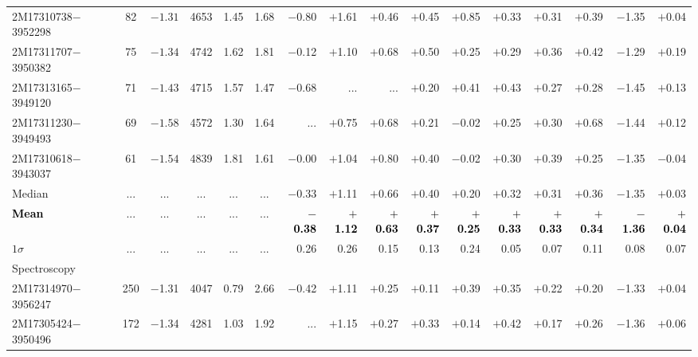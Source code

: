 \documentclass[longauth]{aa} %
\begin{document}
\begin{table*}
\begin{small}
\begin{center}
\begin{tabular}{lcccccrrrrrrrrrr}
2M17310738$-$3952298 &    82 &  $-1.31$ & 4653  & 1.45 &  1.68  &  $-$0.80  &  $+$1.61 &  $+$0.46 & $+$0.45 & $+$0.85 &  $+$0.33 &  $+$0.31 &    $+$0.39 & $-$1.35 &    $+$0.04 \\
2M17311707$-$3950382 &    75 & $-1.34$ & 4742  & 1.62 &  1.81  &  $-$0.12  &  $+$1.10 &   $+$0.68 & $+$0.50 & $+$0.25 &  $+$0.29 &  $+$0.36 &    $+$0.42 & $-$1.29 &    $+$0.19 \\
2M17313165$-$3949120 &    71 & $-1.43$ & 4715  & 1.57 &  1.47  &  $-$0.68   &  ...  &  ...  &  $+$0.20 &  $+$0.41 & $+$0.43 & $+$0.27 &  $+$0.28 &    $-$1.45 &  $+$0.13 \\
2M17311230$-$3949493 &    69 & $-1.58$ & 4572  & 1.30 &  1.64  &  ...               &  $+$0.75 &  $+$0.68 & $+$0.21 & $-$0.02 &  $+$0.25 &  $+$0.30 &    $+$0.68 & $-$1.44 &    $+$0.12 \\
2M17310618$-$3943037 &    61 & $-1.54$ & 4839  & 1.81 &  1.61  &  $-$0.00  &  $+$1.04  &  $+$0.80 & $+$0.40 & $-$0.02 &  $+$0.30 &  $+$0.39 &    $+$0.25 & $-$1.35 &     $-$0.04 \\				
\hline
Median              &  ... &  ... &  ... &  ...  &  ... & $-0.33$  & $+$1.11   & $+$0.66  & $+$0.40 & $+$0.20  & $+$0.32  & $+$0.31  & $+$0.36  & $-1.35$  &  $+$0.03  \\ 
\rowcolor{pink}
\textcolor{black}{\bf Mean    }              &  ... &  ... &  ... &  ...  &  ... & \textcolor{black}{\bf $-$0.38}  &  \textcolor{black}{\bf $+$1.12} & \textcolor{black}{\bf  $+$0.63}  & \textcolor{black}{\bf  $+$0.37} & \textcolor{black}{\bf  $+$0.25}  & \textcolor{black}{\bf  $+$0.33}  &\textcolor{black}{\bf  $+$0.33}  &\textcolor{black}{\bf  $+$0.34} & \textcolor{black}{\bf  $-$1.36}  & \textcolor{black}{\bf  $+$0.04} \\ 
$1\sigma$       &  ... &  ... &  ... &  ...  & ...  &    0.26      &  0.26  & 0.15 &  0.13 &  0.24 & 0.05  & 0.07  & 0.11  & 0.08         &  0.07  \\   
\hline
\hline
					{ Spectroscopy		}	&  &     &  &  &    &  &  &  &   & &  & & &   &  \\
				\hline
				\hline
				2M17314970$-$3956247 &  250  &  $-$1.31 &  4047  &  0.79 &  2.66  & $-$0.42 &   $+$1.11 &   $+$0.25 &   $+$0.11 &     $+$0.39 &   $+$0.35 &  $+$0.22 &    $+$0.20 &  $-$1.33  &    $+$0.04 \\
				2M17305424$-$3950496 &  172  &  $-$1.34 &  4281  &  1.03 &  1.92  &     ...         &   $+$1.15 &   $+$0.27 &   $+$0.33 &     $+$0.14 &   $+$0.42 &  $+$0.17 &    $+$0.26 &  $-$1.36  &    $+$0.06 \\

\end{tabular}
\end{center}
\end{small}
\end{table*}
\end{document}
